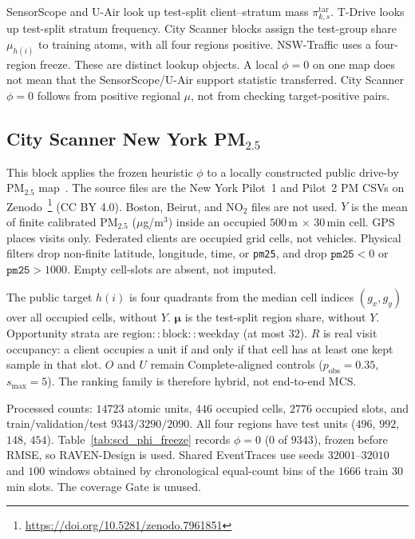 SensorScope and U-Air look up test-split client--stratum mass
$\pi^{\mathrm{tar}}_{k,s}$.  T-Drive looks up test-split stratum
frequency.  City Scanner blocks assign the test-group share $\mu_{h(i)}$
to training atoms, with all four regions positive.  NSW-Traffic uses a
four-region freeze.  These are distinct lookup objects.  A local
$\phi=0$ on one map does not mean that the SensorScope/U-Air
support statistic transferred.  City Scanner $\phi=0$ follows from
positive regional $\mu$, not from checking target-positive pairs.

\subsection{City Scanner New York {PM}$_{2.5}$}
\label{app:cityscanner_nyc}

This block applies the frozen heuristic $\phi$ to a locally constructed
public drive-by
{PM}$_{2.5}$ map~\cite{wang2023cityscanner}.
The source files are the New York Pilot~1 and Pilot~2 {PM} CSVs on
Zenodo~\footnote{\url{https://doi.org/10.5281/zenodo.7961851}}
({CC BY} 4.0).  Boston, Beirut, and {NO}$_2$ files are not used.
$Y$ is the mean of finite calibrated {PM}$_{2.5}$ ($\mu$g/m$^3$) inside
an occupied $500$\,m $\times$ $30$\,min cell.
GPS places visits only.
Federated clients are occupied grid cells, not vehicles.
Physical filters drop non-finite latitude, longitude, time, or
\texttt{pm25}, and drop $\texttt{pm25}<0$ or $\texttt{pm25}>1000$.
Empty cell-slots are absent, not imputed.

The public target $h(i)$ is four quadrants from the median cell indices
$(g_x,g_y)$ over all occupied cells, without $Y$.
$\boldsymbol\mu$ is the test-split region share, without $Y$.
Opportunity strata are $\mathrm{region}{::}\mathrm{block}{::}\mathrm{weekday}$
(at most $32$).
$R$ is real visit occupancy: a client occupies a unit if and only if
that cell has at least one kept sample in that slot.
$O$ and $U$ remain Complete-aligned controls
($p_{\mathrm{obs}}=0.35$, $s_{\max}=5$).
The ranking family is therefore hybrid, not end-to-end MCS.

Processed counts: $14723$ atomic units, $446$ occupied cells, $2776$
occupied slots, and train/validation/test $9343/3290/2090$.
All four regions have test units
($496$, $992$, $148$, $454$).
Table~\ref{tab:scd_phi_freeze} records $\phi=0$ ($0$ of $9343$), frozen
before RMSE, so RAVEN-Design is used.
Shared EventTraces use seeds $32001$--$32010$ and $100$ windows obtained
by chronological equal-count bins of the $1666$ train $30$\,min slots.
The coverage Gate is unused.

